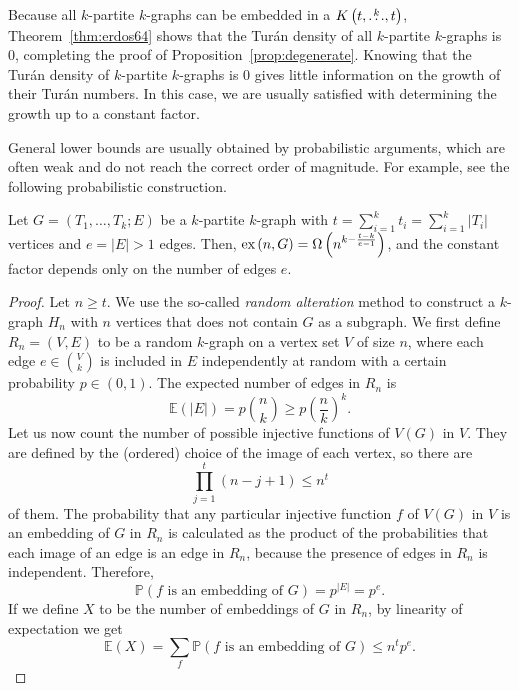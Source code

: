 Because all $k$-partite $k$-graphs can be embedded in a $K\left(t, \overset{k}{\dots}, t\right)$,
Theorem~\ref{thm:erdos64} shows that the Turán density of all $k$-partite $k$-graphs is $0$,
completing the proof of Proposition~\ref{prop:degenerate}.
Knowing that the Turán density of $k$-partite $k$-graphs is $0$ gives little information on the growth of their Turán numbers.
In this case, we are usually satisfied with determining the growth up to a constant factor.

General lower bounds are usually obtained by probabilistic arguments,
which are often weak and do not reach the correct order of magnitude.
For example, see the following probabilistic construction.

\begin{proposition} \label{prop:probabilistic-lower-bound}
    Let $G = (T_1, \dots, T_k; E)$ be a $k$-partite $k$-graph with
    $t = \sum_{i=1}^{k} t_i = \sum_{i=1}^{k} |T_i|$ vertices
    and $e = |E| > 1$ edges.
    Then, $\text{ex} \left( n, G \right) = \Omega\left(n^{k - \frac{t - k}{e - 1}} \right)$, and the
    constant factor depends only on the number of edges $e$.
    \begin{proof}
        Let $n \geq t$.
        We use the so-called \emph{random alteration} method to construct a $k$-graph
        $H_n$ with $n$ vertices that does not contain $G$ as a subgraph.
        We first define $R_n = (V, E)$ to be a random $k$-graph on a vertex set $V$ of size $n$,
        where each edge $e \in \binom{V}{k}$ is included in $E$ independently at random
        with a certain probability $p \in (0, 1)$.
        The expected number of edges in $R_n$ is
        \[
            \mathbb{E}(|E|) = p \binom{n}{k} \geq p \left( \frac{n}{k} \right)^k.
        \]
        Let us now count the number of possible injective functions of $V(G)$ in $V$.
        They are defined by the (ordered) choice of the image of each vertex, so there are
        \[
            \prod_{j=1}^{t} (n - j + 1) \leq n^t
        \]
        of them.
        The probability that any particular injective function $f$ of $V(G)$ in $V$ is an embedding of $G$ in $R_n$
        is calculated as the product of the probabilities that each image of an edge is an edge in $R_n$,
        because the presence of edges in $R_n$ is independent.
        Therefore,
        \[
            \mathbb{P}(f \text{ is an embedding of } G) = p^{|E|} = p^{e}.
        \]
        If we define $X$ to be the number of embeddings of $G$ in $R_n$, by linearity of expectation we get
        \[
            \mathbb{E}(X) = \sum_{f} \mathbb{P}(f \text{ is an embedding of } G) \leq n^t p^{e}.
\]
\end{proof}
\end{proposition}
